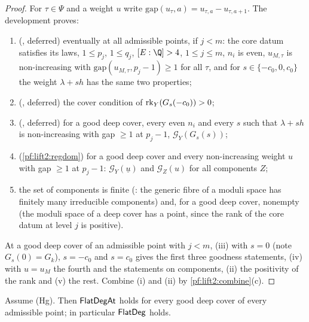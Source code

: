 \begin{proof}
For $\tau\in\Psi$ and a weight $u$ write $\mathrm{gap}(u_\tau,a)=u_{\tau,a}-u_{\tau,a+1}$. The development proves:
\begin{enumerate}[label=(\roman*)]
\item (, deferred) eventually at all admissible points, if
$j<m$: the core datum satisfies its laws, $1\le p_j$, $1\le q_j$, $[E:\Q]>4$, $1\le j\le m$, $n_i$ is even,
$u_{M,\tau}$ is non-increasing with $\mathrm{gap}(u_{M,\tau},p_j-1)\ge1$ for all $\tau$, and for
$s\in\{-c_0,0,c_0\}$ the weight $\lambda+sh$ has the same two properties;
\item (, deferred) the cover condition of
$\operatorname{rk}_Y(G_s(-c_0))>0$;
\item (, deferred) for a good deep cover, every even $n_i$
and every $s$ such that $\lambda+sh$ is non-increasing with gap $\ge1$ at $p_j-1$, $\mathcal G_Y(G_s(s))$;
\item (\cref{pf:lift2:regdom}) for a good deep cover and every non-increasing weight $u$ with gap $\ge1$ at $p_j-1$:
$\mathcal G_Y(\underline u)$ and $\mathcal G_Z(u)$ for all components $Z$;
\item the set of components is finite (: the generic fibre of a
moduli space has finitely many irreducible components) and, for a good deep cover, nonempty (the moduli space of a
deep cover has a point, since the rank of the core datum at level $j$ is positive).
\end{enumerate}
At a good deep cover of an admissible point with $j<m$, (iii) with $s=0$ (note $G_s(0)=G_k$), $s=-c_0$ and $s=c_0$
gives the first three goodness statements, (iv) with $u=u_M$ the fourth and the statements on components, (ii) the
positivity of the rank and (v) the rest. Combine (i) and (ii) by \cref{pf:lift2:combine}(c).
\end{proof}

\begin{proposition}\label{pf:lift2:flatdeg}
Assume \textup{(Hg)}. Then $\mathsf{FlatDegAt}$ holds for every good deep cover of every admissible point; in
particular $\mathsf{FlatDeg}$ holds.
\end{proposition}

